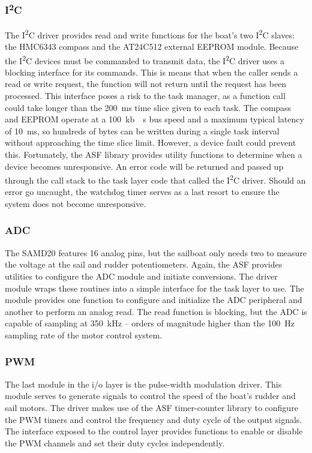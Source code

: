 \documentclass[12pt]{article}
\newcommand{\IIC}{I\textsuperscript{2}C }
\begin{document}
\subsubsection{\IIC}
The \IIC driver provides read and write functions for the boat's two \IIC slaves: the HMC6343 compass and the AT24C512 external EEPROM module. Because the \IIC devices must be commanded to transmit data, the \IIC driver uses a blocking interface for its commands. This is means that when the caller sends a read or write request, the function will not return until the request has been processed. This interface poses a risk to the task manager, as a function call could take longer than the \SI{200}{\milli\second} time slice given to each task. The compass and EEPROM operate at a \SI{100}{\kilo b \per\second} bus speed and a maximum typical latency of \SI{10}{\milli\second}, so hundreds of bytes can be written during a single task interval without approaching the time slice limit. However, a device fault could prevent this. Fortunately, the ASF library provides utility functions to determine when a device becomes unresponsive. An error code will be returned and passed up through the call stack to the task layer code that called the \IIC driver. Should an error go uncaught, the watchdog timer serves as a last resort to ensure the system does not become unresponsive. 

\subsubsection{ADC}
The SAMD20 features 16 analog pins, but the sailboat only needs two to measure the voltage at the sail and rudder potentiometers. Again, the ASF provides utilities to configure the ADC module and initiate conversions. The driver module wraps these routines into a simple interface for the task layer to use. The module provides one function to configure and initialize the ADC peripheral and another to perform an analog read. The read function is blocking, but the ADC is capable of sampling at \SI{350}{\kilo\hertz} -- orders of magnitude higher than the \SI{100}{\hertz} sampling rate of the motor control system.

\subsubsection{PWM}
The last module in the i/o layer is the pulse-width modulation driver. This module serves to generate signals to control the speed of the boat's rudder and sail motors. The driver makes use of the ASF timer-counter library to configure the PWM timers and control the frequency and duty cycle of the output signals. The interface exposed to the control layer provides functions to enable or disable the PWM channels and set their duty cycles independently. 
\clearpage
\end{document}
